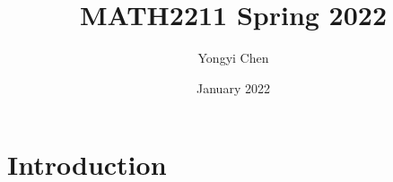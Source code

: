 \documentclass{article}
\title{MATH2211 Spring 2022}
\author{Yongyi Chen}
\date{January 2022}
\begin{document}
\maketitle

\section{Introduction}
\end{document}
